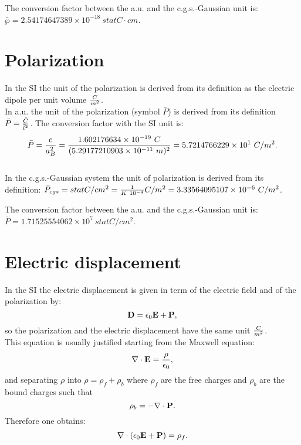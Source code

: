 \documentclass[12pt,a4paper]{article}
\def\barl{5.29177210903\times 10^{-11}}
\def\barc{1.602176634\times 10^{-19}}
\def\barpolar{5.7214766229\times 10^{1}}
\def\polartopolar{3.33564095107\times 10^{-6}}
\def\bardipcgs{2.54174647389\times 10^{-18}}
\def\barpolarcgs{1.71525554062\times 10^{7}}
\begin{document}
{\color{green} 
The conversion factor between the a.u. and the c.g.s.-Gaussian unit is: 
$\bar \wp = \bardipcgs \ statC\cdot cm$.
}

\newpage
\section{\color{coral}Polarization}
In the SI the unit of the polarization is derived from its definition as
the electric dipole per unit volume ${C \over m^2}$. 
\\

{\color{web-blue} In a.u. the unit of the polarization (symbol $\bar P$) 
is derived from its definition $\bar P={\bar C \over \bar l^2}$. The 
conversion factor with the SI unit is:
\begin{equation}
\bar P = {e \over a_B^2} =
{\barc\ C \over (\barl\ m)^2} = \barpolar\ C/m^2.
\end{equation}
}
\\

{\color{orange} In the c.g.s.-Gaussian system the unit of polarization
is derived from its definition:
$\bar P_{cgs}=statC/cm^2 = {1\over K\ 10^{-4}} C/m^2=\polartopolar\ C/m^2$. 
\\
}

{\color{green} 
The conversion factor between the a.u. and the c.g.s.-Gaussian unit is: 
$\bar P = \barpolarcgs \ statC/cm^2$.
}

\newpage
\section{\color{coral}Electric displacement}
In the SI the electric displacement is given in term of the
electric field and of the polarization by:
\begin{equation}
{\bf D}=\epsilon_0 {\bf E} + {\bf P},
\label{eldisp}
\end{equation}
so the polarization and the electric displacement have the same
unit ${C \over m^2}$. \\
This equation is usually justified starting from
the Maxwell equation:
\begin{equation}
\nabla \cdot {\bf E} = {\rho \over \epsilon_0},
\end{equation}
and separating $\rho$ into $\rho=\rho_f + \rho_b$ where
$\rho_f$ are the free charges and $\rho_b$ are the 
bound charges such that
\begin{equation}
\rho_b=-\nabla \cdot {\bf P}.
\end{equation}
Therefore one obtains:
\begin{equation}
\nabla \cdot (\epsilon_0 {\bf E}+ {\bf P})=\rho_f. 
\end{equation}
\\
\end{document}
